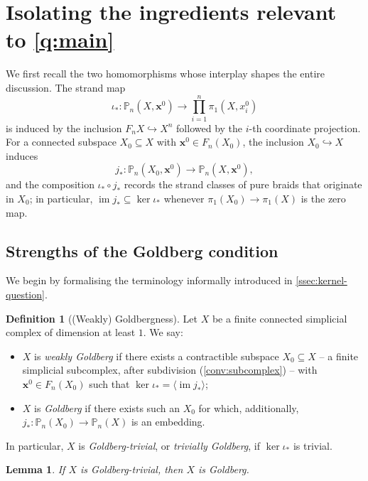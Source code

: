 \documentclass[reqno]{amsart}
\newtheorem{lemma}[theorem]{Lemma}
\theoremstyle{definition}
\newtheorem{definition}[theorem]{Definition}
\newcommand\bfx{\mathbf{x}}
\newcommand{\PB}{\mathbb{P}}
\newcommand{\im}{\operatorname{im}}
\newcommand{\co}[1]{\mathopen{\langle}#1\mathclose{\rangle}} %
\newcommand{\base}{\bfx^0}
\numberwithin{equation}{section}
\begin{document}
\section{Isolating the ingredients relevant to \cref{q:main}}
\label{sec:isolate}


We first recall the two homomorphisms whose interplay shapes the
entire discussion. The strand map
\[
\iota_\ast\colon \PB_n(X,\base)\longrightarrow
\prod_{i=1}^n \pi_1(X, x_i^0)
\]
is induced by the inclusion \(F_n X\hookrightarrow X^n\) followed
by the \(i\)-th coordinate projection.
For a connected subspace \(X_0\subseteq X\) with \(\base\in F_n(X_0)\), the
inclusion \(X_0\hookrightarrow X\) induces
\[
j_\ast\colon \PB_n(X_0,\base)\longrightarrow\PB_n(X,\base),
\]
and the composition \(\iota_\ast\circ j_\ast\) records the strand
classes of pure braids that originate in \(X_0\); in particular,
\(\im j_\ast\subseteq\ker\iota_\ast\) whenever \(\pi_1(X_0)\to\pi_1(X)\)
is the zero map.

\subsection{Strengths of the Goldberg condition}
\label{ssec:goldberg-strengths}

We begin by formalising the terminology informally introduced in
\cref{ssec:kernel-question}.

\begin{definition}[(Weakly) Goldbergness]\label{def:goldberg-strengths}
Let \(X\) be a finite connected simplicial complex of dimension at
least \(1\). We say:
\begin{itemize}[leftmargin=2em]
    \item \(X\) is \emph{weakly Goldberg} if there exists a
          contractible subspace \(X_0\subseteq X\) -- a finite
          simplicial subcomplex, after subdivision
          (\cref{conv:subcomplex}) -- with \(\base\in F_n(X_0)\) such
          that \(\ker \iota_\ast=\co{\im j_\ast}\);
    \item \(X\) is \emph{Goldberg} if there exists such
          an \(X_0\) for which, additionally,
          \(j_\ast\colon\PB_n(X_0)\to\PB_n(X)\) is an embedding.
\end{itemize}
In particular, \(X\) is \emph{Goldberg-trivial}, or \emph{trivially
Goldberg}, if \(\ker\iota_\ast\) is trivial.
\end{definition}

\begin{lemma}\label{lem:gt-implies-goldberg}
If \(X\) is Goldberg-trivial, then \(X\) is Goldberg.
\end{lemma}
\end{document}
